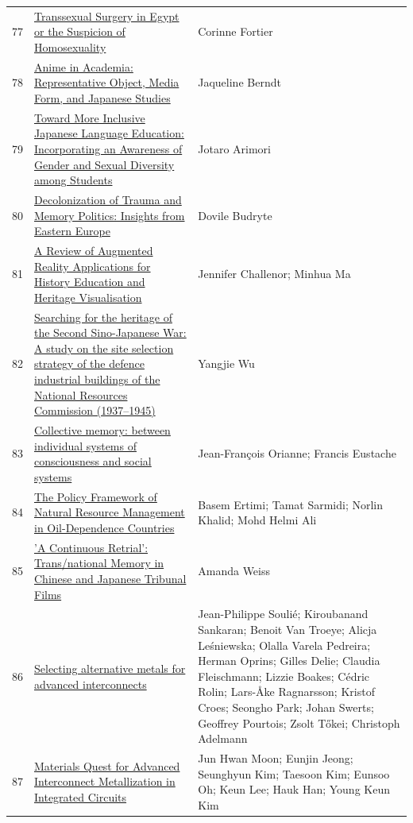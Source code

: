 \documentclass[11pt]{article}
\begin{document}
\begin{longtable}{cp{8cm}p{5cm}}
  77 & \href{https://hal.science/hal-05097583v1/document}{Transsexual Surgery in Egypt or the Suspicion of Homosexuality} & Corinne Fortier \\
  78 & \href{https://www.mdpi.com/2076-0752/7/4/56}{Anime in Academia: Representative Object, Media Form, and Japanese Studies} & Jaqueline Berndt \\
  79 & \href{https://jll.pitt.edu/ojs/JLL/article/view/129}{Toward More Inclusive Japanese Language Education: Incorporating an Awareness of Gender and Sexual Diversity among Students} & Jotaro Arimori \\
  80 & \href{https://www.mdpi.com/2076-0787/5/1/7}{Decolonization of Trauma and Memory Politics: Insights from Eastern Europe} & Dovile Budryte \\
  81 & \href{https://www.mdpi.com/2414-4088/3/2/39}{A Review of Augmented Reality Applications for History Education and Heritage Visualisation} & Jennifer Challenor; Minhua Ma \\
  82 & \href{https://journals.plos.org/plosone/article?id=10.1371/journal.pone.0311436}{Searching for the heritage of the Second Sino-Japanese War: A study on the site selection strategy of the defence industrial buildings of the National Resources Commission (1937–1945)} & Yangjie Wu \\
  83 & \href{https://www.frontiersin.org/journals/psychology/articles/10.3389/fpsyg.2023.1238272/full}{Collective memory: between individual systems of consciousness and social systems} & Jean-François Orianne; Francis Eustache \\
  84 & \href{https://www.mdpi.com/2227-7099/9/1/25}{The Policy Framework of Natural Resource Management in Oil-Dependence Countries} & Basem Ertimi; Tamat Sarmidi; Norlin Khalid; Mohd Helmi Ali \\
  85 & \href{https://www.mdpi.com/2076-0752/9/1/2}{'A Continuous Retrial': Trans/national Memory in Chinese and Japanese Tribunal Films} & Amanda Weiss \\
  86 & \href{https://pubs.aip.org/aip/jap/article/136/17/171101/3318627/Selecting-alternative-metals-for-advanced}{Selecting alternative metals for advanced interconnects} & Jean-Philippe Soulié; Kiroubanand Sankaran; Benoit Van Troeye; Alicja Leśniewska; Olalla Varela Pedreira; Herman Oprins; Gilles Delie; Claudia Fleischmann; Lizzie Boakes; Cédric Rolin; Lars-Åke Ragnarsson; Kristof Croes; Seongho Park; Johan Swerts; Geoffrey Pourtois; Zsolt Tőkei; Christoph Adelmann \\
  87 & \href{https://advanced.onlinelibrary.wiley.com/doi/10.1002/advs.202207321}{Materials Quest for Advanced Interconnect Metallization in Integrated Circuits} & Jun Hwan Moon; Eunjin Jeong; Seunghyun Kim; Taesoon Kim; Eunsoo Oh; Keun Lee; Hauk Han; Young Keun Kim \\

\end{longtable}
\end{document}

